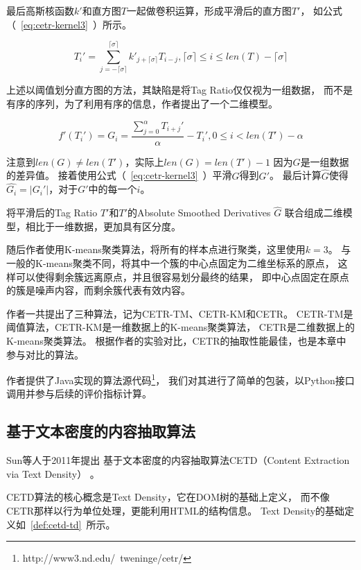 最后高斯核函数$k'$和直方图$T$一起做卷积运算，形成平滑后的直方图$T'$，
如公式（~\ref{eq:cetr-kernel3}~）所示。

\begin{equation}
\label{eq:cetr-kernel3}
T_i' = \sum_{j=-\lceil \sigma \rceil}^{\lceil \sigma \rceil}
k'_{j+\lceil \sigma \rceil} T_{i-j},
\lceil \sigma \rceil \leq i \leq len(T)-\lceil \sigma \rceil
\end{equation}

上述以阈值划分直方图的方法，其缺陷是将Tag Ratio仅仅视为一组数据，
而不是有序的序列，为了利用有序的信息，作者提出了一个二维模型。

\begin{equation}
\label{eq:cetr-kernel4}
f'(T_i')=G_i=\frac{\sum_{j=0}^{\alpha} T_{i+j}'}{\alpha} - T_i',
0 \leq i < len(T') - \alpha
\end{equation}

注意到$len(G) \neq len(T')$，实际上$len(G)=len(T')-1$
因为$G$是一组数据的差异值。
接着使用公式（~\ref{eq:cetr-kernel3}~）平滑$G$得到$G'$。
最后计算$\hat{G}$使得$\hat{G_i}=\vert G_i' \vert$，对于$G'$中的每一个$i$。

将平滑后的Tag Ratio $T'$和$T'$的Absolute Smoothed Derivatives $\hat{G}$
联合组成二维模型，相比于一维数据，更加具有区分度。

随后作者使用K-means聚类算法，将所有的样本点进行聚类，这里使用$k=3$。
与一般的K-means聚类不同，将其中一个簇的中心点固定为二维坐标系的原点，
这样可以使得剩余簇远离原点，并且很容易划分最终的结果，
即中心点固定在原点的簇是噪声内容，而剩余簇代表有效内容。

作者一共提出了三种算法，记为CETR-TM、CETR-KM和CETR。
CETR-TM是阈值算法，CETR-KM是一维数据上的K-means聚类算法，
CETR是二维数据上的K-means聚类算法。
根据作者的实验对比，CETR的抽取性能最佳，也是本章中参与对比的算法。

作者提供了Java实现的算法源代码\footnote{http://www3.nd.edu/~tweninge/cetr/}，
我们对其进行了简单的包装，以Python接口调用并参与后续的评价指标计算。

\subsection{基于文本密度的内容抽取算法}
Sun等人于2011年提出
基于文本密度的内容抽取算法CETD（Content Extraction via Text Density）
。

CETD算法的核心概念是Text Density，它在DOM树的基础上定义，
而不像CETR那样以行为单位处理，更能利用HTML的结构信息。
Text Density的基础定义如~\ref{def:cetd-td}~所示。

